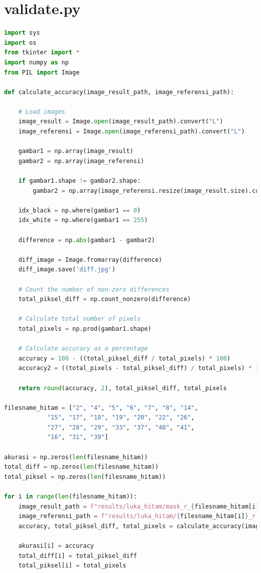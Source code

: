 \section{validate.py}
\begin{lstlisting}[language=Python,basicstyle=\tiny]
import sys
import os
from tkinter import *
import numpy as np
from PIL import Image

def calculate_accuracy(image_result_path, image_referensi_path):

	# Load images
	image_result = Image.open(image_result_path).convert("L")
	image_referensi = Image.open(image_referensi_path).convert("L")
	
	gambar1 = np.array(image_result)
	gambar2 = np.array(image_referensi)

	if gambar1.shape != gambar2.shape:
		gambar2 = np.array(image_referensi.resize(image_result.size).convert('L'))

	idx_black = np.where(gambar1 == 0)
	idx_white = np.where(gambar1 == 255)

	difference = np.abs(gambar1 - gambar2)

	diff_image = Image.fromarray(difference)
	diff_image.save('diff.jpg')

	# Count the number of non-zero differences
	total_piksel_diff = np.count_nonzero(difference)

	# Calculate total number of pixels
	total_pixels = np.prod(gambar1.shape)

	# Calculate accuracy as a percentage
	accuracy = 100 - ((total_piksel_diff / total_pixels) * 100)
	accuracy2 = ((total_pixels - total_piksel_diff) / total_pixels) * 100

	return round(accuracy, 2), total_piksel_diff, total_pixels

filesname_hitam = ["2", "4", "5", "6", "7", "8", "14", 
			"15", "17", "18", "19", "20", "22", "26", 
			"27", "28", "29", "33", "37", "40", "41", 
			"16", "31", "39"]

akurasi = np.zeros(len(filesname_hitam))
total_diff = np.zeros(len(filesname_hitam))
total_piksel = np.zeros(len(filesname_hitam))

for i in range(len(filesname_hitam)):
	image_result_path = f"results/luka_hitam/mask_r_{filesname_hitam[i]}.jpg"
	image_referensi_path = f"results/luka_hitam/{filesname_hitam[i]}_r.jpg"
	accuracy, total_piksel_diff, total_pixels = calculate_accuracy(image_result_path, image_referensi_path)

	akurasi[i] = accuracy
	total_diff[i] = total_piksel_diff
	total_piksel[i] = total_pixels	
\end{lstlisting}

